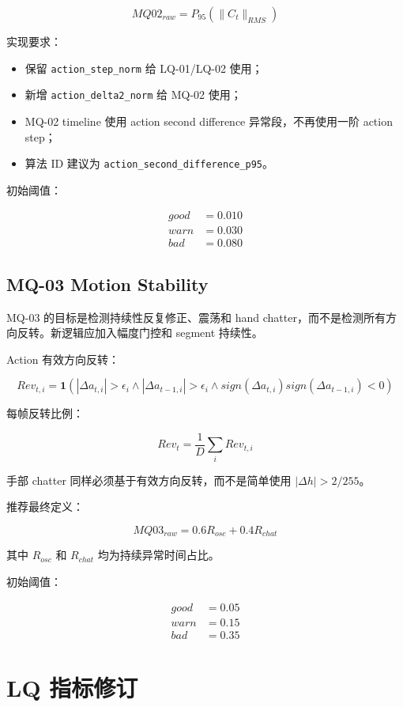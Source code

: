 \documentclass[UTF8,zihao=-4]{ctexart}
\newcommand{\Code}[1]{\texttt{#1}}
\begin{document}
\[
MQ02_{raw}=P_{95}(\|C_t\|_{RMS})
\]

实现要求：

\begin{itemize}
\item 保留 \Code{action\_step\_norm} 给 LQ-01/LQ-02 使用；
\item 新增 \Code{action\_delta2\_norm} 给 MQ-02 使用；
\item MQ-02 timeline 使用 action second difference 异常段，不再使用一阶 action step；
\item 算法 ID 建议为 \Code{action\_second\_difference\_p95}。
\end{itemize}

初始阈值：

\[
\begin{aligned}
good &= 0.010\\
warn &= 0.030\\
bad &= 0.080
\end{aligned}
\]

\subsection{MQ-03 Motion Stability}

MQ-03 的目标是检测持续性反复修正、震荡和 hand chatter，而不是检测所有方向反转。新逻辑应加入幅度门控和 segment 持续性。

Action 有效方向反转：

\[
Rev_{t,i}=\mathbf1(|\Delta a_{t,i}|>\epsilon_i \land |\Delta a_{t-1,i}|>\epsilon_i \land sign(\Delta a_{t,i})sign(\Delta a_{t-1,i})<0)
\]

每帧反转比例：

\[
Rev_t=\frac{1}{D}\sum_i Rev_{t,i}
\]

手部 chatter 同样必须基于有效方向反转，而不是简单使用 \(|\Delta h|>2/255\)。

推荐最终定义：

\[
MQ03_{raw}=0.6R_{osc}+0.4R_{chat}
\]

其中 \(R_{osc}\) 和 \(R_{chat}\) 均为持续异常时间占比。

初始阈值：

\[
\begin{aligned}
good &= 0.05\\
warn &= 0.15\\
bad &= 0.35
\end{aligned}
\]

\section{LQ 指标修订}
\end{document}
